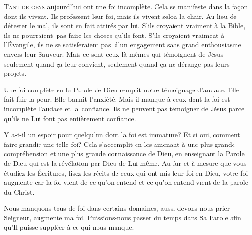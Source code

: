 



\lettrine{T}{ant de gens} aujourd'hui ont une foi incomplète.
 Cela se manifeste dans la fa\c{c}on dont ils vivent. Ils professent leur foi,
 mais ils vivent selon la chair. Au lieu de détester le mal,
 ils sont en fait attirés par lui. S'ils croyaient vraiment à la Bible,
 ils ne pourraient~pas faire les choses qu'ils font.
 S'ils croyaient vraiment à l'Évangile, ils ne se satisferaient pas~d'un
 engagement sans grand enthousiasme envers leur Sauveur.
 Mais ce sont ceux-là mêmes qui témoignent de Jésus seulement
 quand \c{c}a leur convient, seulement quand \c{c}a ne dérange pas leurs projets.


Une foi complète en la Parole de Dieu remplit notre témoignage d'audace.
 Elle fait fuir la peur. Elle bannit l'anxiété. Mais il manque à ceux
 dont la foi est incomplète l'audace et la~confiance.
 Ils ne peuvent pas témoigner de Jésus parce qu'ils ne Lui font pas
 entièrement confiance.

Y a-t-il un espoir pour quelqu'un dont la foi est immature?
 Et si oui, comment faire grandir une telle foi? Cela s'accomplit
 en les amenant à une plus grande compréhension et une plus grande
 connaissance de Dieu, en enseignant la Parole de Dieu qui est la révélation
 par Dieu de Lui-même. Au fur et à mesure que vous étudiez les Écritures,
 lisez les récits de ceux qui ont mis leur foi en Dieu, votre foi augmente
 \ocadr car la foi vient de ce qu'on entend et ce qu'on entend vient
 de la parole du Christ.

Nous manquons tous de foi dans certains domaines, aussi devons-nous prier\frcolon{} 
 \Og Seigneur, augmente ma foi. \Fg{}
 Puissions-nous passer du temps dans Sa Parole afin qu'Il puisse
 suppléer à ce qui nous manque.

\dvrule




